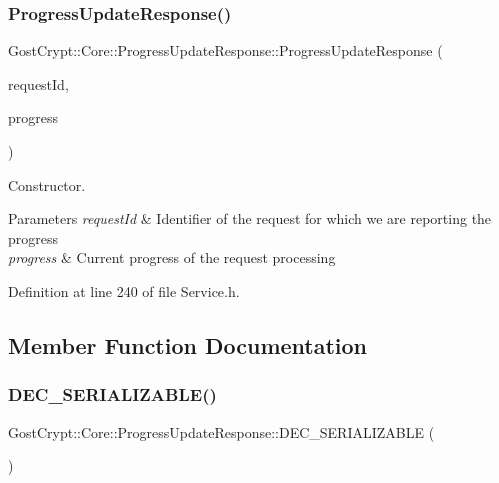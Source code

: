 \subsubsection{\texorpdfstring{Progress\+Update\+Response()}{ProgressUpdateResponse()}\hspace{0.1cm}{\footnotesize\ttfamily [2/2]}}
{\footnotesize\ttfamily Gost\+Crypt\+::\+Core\+::\+Progress\+Update\+Response\+::\+Progress\+Update\+Response (\begin{DoxyParamCaption}\item[{quint32}]{request\+Id,  }\item[{qreal}]{progress }\end{DoxyParamCaption})\hspace{0.3cm}{\ttfamily [inline]}}



Constructor. 


\begin{DoxyParams}{Parameters}
{\em request\+Id} & Identifier of the request for which we are reporting the progress \\
\hline
{\em progress} & Current progress of the request processing \\
\hline
\end{DoxyParams}


Definition at line 240 of file Service.\+h.



\subsection{Member Function Documentation}
\mbox{\label{struct_gost_crypt_1_1_core_1_1_progress_update_response_a370588f845184095b75f40f9f3ff52a2}} 
\subsubsection{\texorpdfstring{D\+E\+C\+\_\+\+S\+E\+R\+I\+A\+L\+I\+Z\+A\+B\+L\+E()}{DEC\_SERIALIZABLE()}}
{\footnotesize\ttfamily Gost\+Crypt\+::\+Core\+::\+Progress\+Update\+Response\+::\+D\+E\+C\+\_\+\+S\+E\+R\+I\+A\+L\+I\+Z\+A\+B\+LE (\begin{DoxyParamCaption}\item[{\hyperlink{struct_gost_crypt_1_1_core_1_1_progress_update_response}{Progress\+Update\+Response}}]{ }\end{DoxyParamCaption})}



